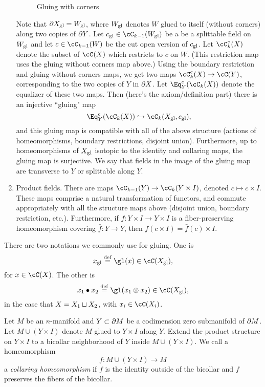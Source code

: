 \begin{enumerate}
\begin{figure}[t]
\begin{center}
\begin{tikzpicture}
\end{tikzpicture}
\end{center}
\caption{Gluing with corners}
\label{fig:gluing-with-corners}
\end{figure}
Note that $\bd X\sgl = W\sgl$, where $W\sgl$ denotes $W$ glued to itself
(without corners) along two copies of $\bd Y$.
Let $c\sgl \in \cC_{k-1}(W\sgl)$ be a be a splittable field on $W\sgl$ and let
$c \in \cC_{k-1}(W)$ be the cut open version of $c\sgl$.
Let $\cC^c_k(X)$ denote the subset of $\cC(X)$ which restricts to $c$ on $W$.
(This restriction map uses the gluing without corners map above.)
Using the boundary restriction and gluing without corners maps, 
we get two maps $\cC^c_k(X) \to \cC(Y)$, corresponding to the two
copies of $Y$ in $\bd X$.
Let $\Eq^c_Y(\cC_k(X))$ denote the equalizer of these two maps.
Then (here's the axiom/definition part) there is an injective ``gluing" map
\[
	\Eq^c_Y(\cC_k(X)) \hookrightarrow \cC_k(X\sgl, c\sgl) ,
\]
and this gluing map is compatible with all of the above structure (actions
of homeomorphisms, boundary restrictions, disjoint union).
Furthermore, up to homeomorphisms of $X\sgl$ isotopic to the identity
and collaring maps,
the gluing map is surjective.
We say that fields in the image of the gluing map
are transverse to $Y$ or splittable along $Y$.
\item Product fields.
There are maps $\cC_{k-1}(Y) \to \cC_k(Y \times I)$, denoted
$c \mapsto c\times I$.
These maps comprise a natural transformation of functors, and commute appropriately
with all the structure maps above (disjoint union, boundary restriction, etc.).
Furthermore, if $f: Y\times I \to Y\times I$ is a fiber-preserving homeomorphism
covering $\bar{f}:Y\to Y$, then $f(c\times I) = \bar{f}(c)\times I$.
\end{enumerate}

There are two notations we commonly use for gluing.
One is 
\[
	x\sgl \deq \gl(x) \in \cC(X\sgl) , 
\]
for $x\in\cC(X)$.
The other is
\[
	x_1\bullet x_2 \deq \gl(x_1\otimes x_2) \in \cC(X\sgl) , 
\]
in the case that $X = X_1 \du X_2$, with $x_i \in \cC(X_i)$.

\medskip


Let $M$ be an $n$-manifold and $Y \subset \bd M$ be a codimension zero submanifold
of $\bd M$.
Let $M \cup (Y\times I)$ denote $M$ glued to $Y\times I$ along $Y$.
Extend the product structure on $Y\times I$ to a bicollar neighborhood of 
$Y$ inside $M \cup (Y\times I)$.
We call a homeomorphism
\[
	f: M \cup (Y\times I) \to M
\]
a {\it collaring homeomorphism} if $f$ is the identity outside of the bicollar
and $f$ preserves the fibers of the bicollar.


